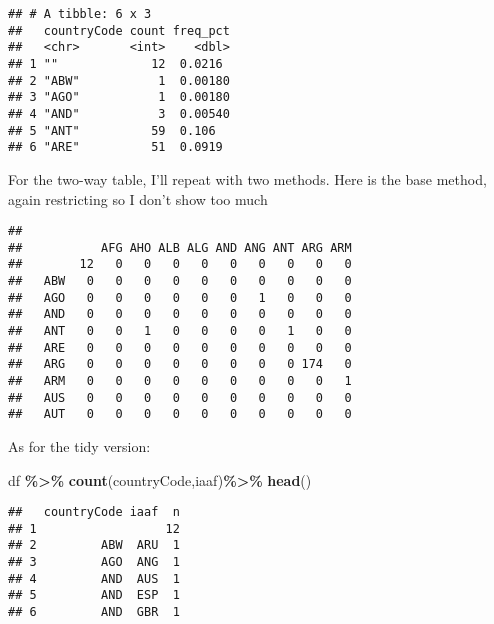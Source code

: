 \documentclass[
]{article}
\newenvironment{Shaded}{\begin{snugshade}}{\end{snugshade}}
\newcommand{\DecValTok}[1]{\textcolor[rgb]{0.00,0.00,0.81}{#1}}
\newcommand{\FunctionTok}[1]{\textcolor[rgb]{0.13,0.29,0.53}{\textbf{#1}}}
\newcommand{\NormalTok}[1]{#1}
\newcommand{\SpecialCharTok}[1]{\textcolor[rgb]{0.81,0.36,0.00}{\textbf{#1}}}
\begin{document}
\begin{verbatim}
## # A tibble: 6 x 3
##   countryCode count freq_pct
##   <chr>       <int>    <dbl>
## 1 ""             12  0.0216 
## 2 "ABW"           1  0.00180
## 3 "AGO"           1  0.00180
## 4 "AND"           3  0.00540
## 5 "ANT"          59  0.106  
## 6 "ARE"          51  0.0919
\end{verbatim}

For the two-way table, I'll repeat with two methods. Here is the base
method, again restricting so I don't show too much

\begin{Shaded}
\end{Shaded}

\begin{verbatim}
##      
##           AFG AHO ALB ALG AND ANG ANT ARG ARM
##        12   0   0   0   0   0   0   0   0   0
##   ABW   0   0   0   0   0   0   0   0   0   0
##   AGO   0   0   0   0   0   0   1   0   0   0
##   AND   0   0   0   0   0   0   0   0   0   0
##   ANT   0   0   1   0   0   0   0   1   0   0
##   ARE   0   0   0   0   0   0   0   0   0   0
##   ARG   0   0   0   0   0   0   0   0 174   0
##   ARM   0   0   0   0   0   0   0   0   0   1
##   AUS   0   0   0   0   0   0   0   0   0   0
##   AUT   0   0   0   0   0   0   0   0   0   0
\end{verbatim}

As for the tidy version:

\begin{Shaded}
\begin{Highlighting}[]
\NormalTok{df }\SpecialCharTok{\%\textgreater{}\%} \FunctionTok{count}\NormalTok{(countryCode,iaaf)}\SpecialCharTok{\%\textgreater{}\%}
  \FunctionTok{head}\NormalTok{()}
\end{Highlighting}
\end{Shaded}

\begin{verbatim}
##   countryCode iaaf  n
## 1                  12
## 2         ABW  ARU  1
## 3         AGO  ANG  1
## 4         AND  AUS  1
## 5         AND  ESP  1
## 6         AND  GBR  1
\end{verbatim}
\end{document}
